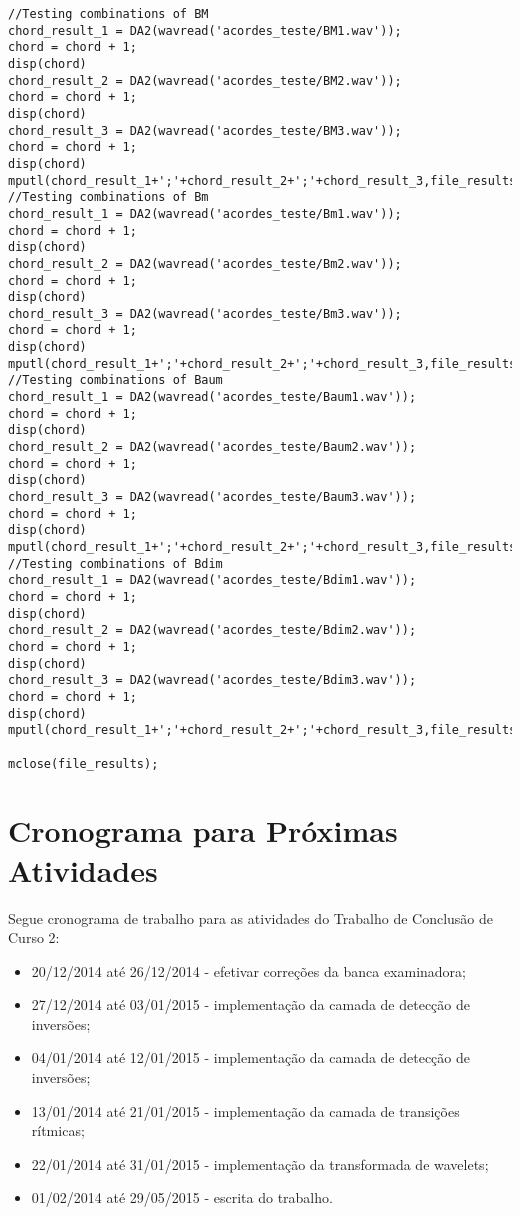 \begin{apendicesenv}
\begin{lstlisting}
//Testing combinations of BM
chord_result_1 = DA2(wavread('acordes_teste/BM1.wav'));
chord = chord + 1;
disp(chord)
chord_result_2 = DA2(wavread('acordes_teste/BM2.wav'));
chord = chord + 1;
disp(chord)
chord_result_3 = DA2(wavread('acordes_teste/BM3.wav'));
chord = chord + 1;
disp(chord)
mputl(chord_result_1+';'+chord_result_2+';'+chord_result_3,file_results);
//Testing combinations of Bm
chord_result_1 = DA2(wavread('acordes_teste/Bm1.wav'));
chord = chord + 1;
disp(chord)
chord_result_2 = DA2(wavread('acordes_teste/Bm2.wav'));
chord = chord + 1;
disp(chord)
chord_result_3 = DA2(wavread('acordes_teste/Bm3.wav'));
chord = chord + 1;
disp(chord)
mputl(chord_result_1+';'+chord_result_2+';'+chord_result_3,file_results);
//Testing combinations of Baum
chord_result_1 = DA2(wavread('acordes_teste/Baum1.wav'));
chord = chord + 1;
disp(chord)
chord_result_2 = DA2(wavread('acordes_teste/Baum2.wav'));
chord = chord + 1;
disp(chord)
chord_result_3 = DA2(wavread('acordes_teste/Baum3.wav'));
chord = chord + 1;
disp(chord)
mputl(chord_result_1+';'+chord_result_2+';'+chord_result_3,file_results);
//Testing combinations of Bdim
chord_result_1 = DA2(wavread('acordes_teste/Bdim1.wav'));
chord = chord + 1;
disp(chord)
chord_result_2 = DA2(wavread('acordes_teste/Bdim2.wav'));
chord = chord + 1;
disp(chord)
chord_result_3 = DA2(wavread('acordes_teste/Bdim3.wav'));
chord = chord + 1;
disp(chord)
mputl(chord_result_1+';'+chord_result_2+';'+chord_result_3,file_results);

mclose(file_results);
\end{lstlisting}

\end{apendicesenv}

\section{Cronograma para Próximas Atividades}
\label{sec:cronograma}

Segue cronograma de trabalho para as atividades do Trabalho de Conclusão de Curso 2:
\begin{itemize}
	\item 20/12/2014 até 26/12/2014 - efetivar correções da banca examinadora;
	\item 27/12/2014 até 03/01/2015 - implementação da camada de detecção de inversões;
	\item 04/01/2014 até 12/01/2015 - implementação da camada de detecção de inversões;
	\item 13/01/2014 até 21/01/2015 - implementação da camada de transições rítmicas;
	\item 22/01/2014 até 31/01/2015 - implementação da transformada de wavelets;
	\item 01/02/2014 até 29/05/2015 - escrita do trabalho.
\end{itemize}
